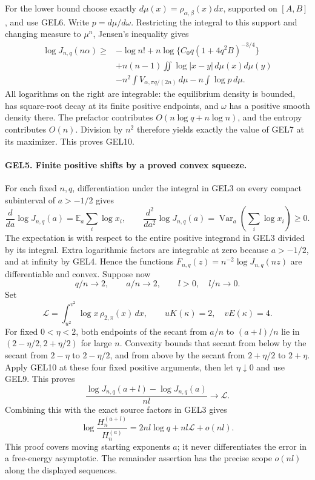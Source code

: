 For the lower bound choose exactly
\(d\mu(x)=\rho_{\alpha,\beta}(x)dx\), supported on \([A,B]\), and use
GEL6. Write \(p=d\mu/d\omega\). Restricting the integral to this support
and changing measure to \(\mu^n\), Jensen's inequality gives
\begin{align*}
 \log J_{n,q}(n\alpha)\geq{}&-
 \log n!+n\log\{C_0q(1+4q^2B)^{-3/4}\}\\
 &+n(n-1)\iint\log|x-y|\,d\mu(x)d\mu(y)\\
 &-n^2\int V_{\alpha,\pi q/(2n)}\,d\mu
       -n\int\log p\,d\mu .
\end{align*}
All logarithms on the right are integrable: the equilibrium density is
bounded, has square-root decay at its finite positive endpoints, and
\(\omega\) has a positive smooth density there. The prefactor contributes
\(O(n\log q+n\log n)\), and the entropy contributes \(O(n)\).
Division by \(n^2\) therefore yields exactly the value of GEL7 at its
maximizer. This proves GEL10.

\paragraph{GEL5. Finite positive shifts by a proved convex squeeze.}
For each fixed \(n,q\), differentiation under the integral in GEL3 on
every compact subinterval of \(a>-1/2\) gives
\[
 \frac{d}{da}\log J_{n,q}(a)=
    \mathbb E_a\sum_i\log x_i,\qquad
 \frac{d^2}{da^2}\log J_{n,q}(a)=
    \operatorname{Var}_a\!\left(\sum_i\log x_i\right)\geq0.
 \tag{GEL11}
\]
The expectation is with respect to the entire positive integrand in
GEL3 divided by its integral. Extra logarithmic factors are integrable
at zero because \(a>-1/2\), and at infinity by GEL4. Hence the
functions \(F_{n,q}(z)=n^{-2}\log J_{n,q}(nz)\) are differentiable
and convex. Suppose now
\[
 q/n\longrightarrow2,\qquad a/n\longrightarrow2,\qquad
 l>0,\quad l/n\longrightarrow0.
\]
Set
\[
 \mathcal L=\int_{u^2}^{v^2}\log x\,\rho_{2,\pi}(x)\,dx,
 \qquad uK(\kappa)=2,\quad vE(\kappa)=4.
 \tag{GEL12}
\]
For fixed \(0<\eta<2\), both endpoints of the secant from \(a/n\) to
\((a+l)/n\) lie in \((2-\eta/2,2+\eta/2)\) for large \(n\).
Convexity bounds that secant from below by the secant from
\(2-\eta\) to \(2-\eta/2\), and from above by the secant from
\(2+\eta/2\) to \(2+\eta\). Apply GEL10 at these four fixed positive
arguments, then let \(\eta\downarrow0\) and use GEL9. This proves
\[
 \frac{\log J_{n,q}(a+l)-\log J_{n,q}(a)}{nl}
       \longrightarrow\mathcal L.
\]
Combining this with the exact source factors in GEL3 gives
\[
 \boxed{\log\frac{H_n^{(a+l)}}{H_n^{(a)}}
       =2nl\log q+nl\mathcal L+o(nl).}
 \tag{GEL13}
\]
This proof covers moving starting exponents \(a\); it never differentiates
the error in a free-energy asymptotic. The remainder assertion has the
precise scope \(o(nl)\) along the displayed sequences.

